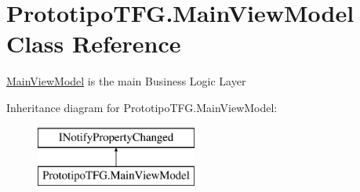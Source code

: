 \hypertarget{class_prototipo_t_f_g_1_1_main_view_model}{}\section{Prototipo\+T\+F\+G.\+Main\+View\+Model Class Reference}
\label{class_prototipo_t_f_g_1_1_main_view_model}


\hyperlink{class_prototipo_t_f_g_1_1_main_view_model}{Main\+View\+Model} is the main Business Logic Layer  


Inheritance diagram for Prototipo\+T\+F\+G.\+Main\+View\+Model\+:\begin{figure}[H]
\begin{center}
\leavevmode
\includegraphics[height=2.000000cm]{class_prototipo_t_f_g_1_1_main_view_model}
\end{center}
\end{figure}
